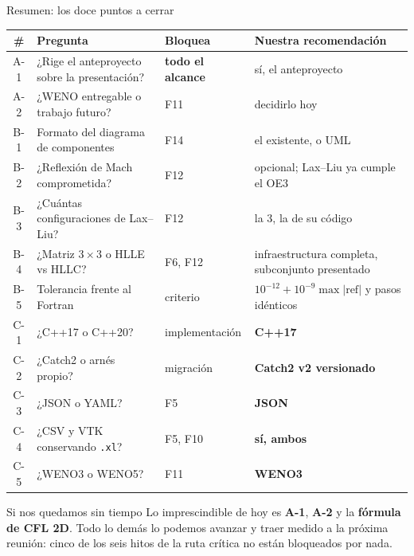 \documentclass[aspectratio=169,10pt]{beamer}
\newcommand{\cod}[1]{\texttt{\small #1}}
\begin{document}
\begin{frame}[shrink]{Resumen: los doce puntos a cerrar}
  \centering\scriptsize
  \begin{tabular}{@{}clll@{}}
    \toprule
    \textbf{\#} & \textbf{Pregunta} & \textbf{Bloquea} & \textbf{Nuestra recomendación} \\
    \midrule
    A-1 & ¿Rige el anteproyecto sobre la presentación? & \textbf{todo el alcance} & sí, el anteproyecto \\
    A-2 & ¿WENO entregable o trabajo futuro? & F11 & decidirlo hoy \\
    B-1 & Formato del diagrama de componentes & F14 & el existente, o UML \\
    B-2 & ¿Reflexión de Mach comprometida? & F12 & opcional; Lax--Liu ya cumple el OE3 \\
    B-3 & ¿Cuántas configuraciones de Lax--Liu? & F12 & la 3, la de su código \\
    B-4 & ¿Matriz $3\times3$ o HLLE vs HLLC? & F6, F12 & infraestructura completa, subconjunto presentado \\
    B-5 & Tolerancia frente al Fortran & criterio & $10^{-12}+10^{-9}\max|\text{ref}|$ y pasos idénticos \\
    C-1 & ¿C++17 o C++20? & implementación & \textbf{C++17} \\
    C-2 & ¿Catch2 o arnés propio? & migración & \textbf{Catch2 v2 versionado} \\
    C-3 & ¿JSON o YAML? & F5 & \textbf{JSON} \\
    C-4 & ¿CSV y VTK conservando \cod{.xl}? & F5, F10 & \textbf{sí, ambos} \\
    C-5 & ¿WENO3 o WENO5? & F11 & \textbf{WENO3} \\
    \bottomrule
  \end{tabular}

  \vspace{0.6em}
  \begin{exampleblock}{Si nos quedamos sin tiempo}
    \small
    Lo imprescindible de hoy es \textbf{A-1}, \textbf{A-2} y la \textbf{fórmula de
    CFL 2D}. Todo lo demás lo podemos avanzar y traer medido a la próxima reunión:
    cinco de los seis hitos de la ruta crítica no están bloqueados por nada.
  \end{exampleblock}
\end{frame}
\end{document}

